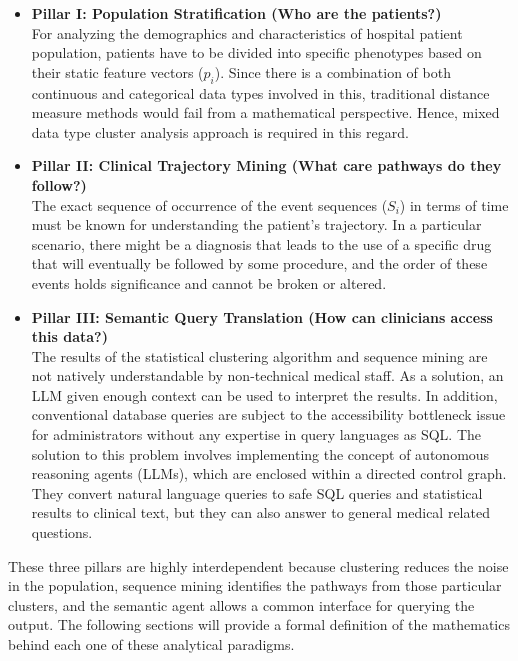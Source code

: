 \begin{itemize}
    \item \textbf{Pillar I: Population Stratification (Who are the patients?)} \\
    For analyzing the demographics and characteristics of hospital patient population, patients have to be divided into specific phenotypes based on their static feature vectors ($p_i$). Since there is a combination of both continuous and categorical data types involved in this, traditional distance measure methods would fail from a mathematical perspective. Hence, mixed data type cluster analysis approach is required in this regard.

    \vspace{0.5em}

    \item \textbf{Pillar II: Clinical Trajectory Mining (What care pathways do they follow?)} \\
    The exact sequence of occurrence of the event sequences ($S_i$) in terms of time must be known for understanding the patient's trajectory. In a particular scenario, there might be a diagnosis that leads to the use of a specific drug that will eventually be followed by some procedure, and the order of these events holds significance and cannot be broken or altered.

    \vspace{0.5em}

    \item \textbf{Pillar III: Semantic Query Translation (How can clinicians access this data?)} \\
    The results of the statistical clustering algorithm and sequence mining are not natively understandable by non-technical medical staff. As a solution, an LLM given enough context can be used to interpret the results. In addition, conventional database queries are subject to the accessibility bottleneck issue for administrators without any expertise in query languages as SQL. The solution to this problem involves implementing the concept of autonomous reasoning agents (LLMs), which are enclosed within a directed control graph. They convert natural language queries to safe SQL queries and statistical results to clinical text, but they can also answer to general medical related questions.
\end{itemize}

\vspace{1em}

These three pillars are highly interdependent because clustering reduces the noise in the population, sequence mining identifies the pathways from those particular clusters, and the semantic agent allows a common interface for querying the output. The following sections will provide a formal definition of the mathematics behind each one of these analytical paradigms.
